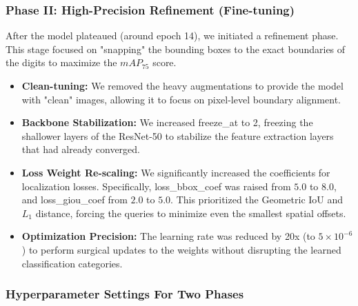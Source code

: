 \documentclass[a4paper]{article} %
\begin{document}
\subsubsection{Phase II: High-Precision Refinement (Fine-tuning)}

After the model plateaued (around epoch 14), we initiated a refinement phase. This stage focused on "snapping" the bounding boxes to the exact boundaries of the digits to maximize the $mAP_{75}$ score.

\begin{itemize}
    \item \textbf{Clean-tuning:} We removed the heavy augmentations to provide the model with "clean" images, allowing it to focus on pixel-level boundary alignment.
    \item \textbf{Backbone Stabilization:} We increased freeze\_at to 2, freezing the shallower layers of the ResNet-50 to stabilize the feature extraction layers that had already converged.
    \item \textbf{Loss Weight Re-scaling:} We significantly increased the coefficients for localization losses. Specifically, loss\_bbox\_coef was raised from $5.0$ to $8.0$, and loss\_giou\_coef from $2.0$ to $5.0$. This prioritized the Geometric IoU and $L_1$ distance, forcing the queries to minimize even the smallest spatial offsets.
    \item \textbf{Optimization Precision:} The learning rate was reduced by 20x (to $5 \times 10^{-6}$) to perform surgical updates to the weights without disrupting the learned classification categories.
\end{itemize}

\subsubsection{Hyperparameter Settings For Two Phases}
\end{document}
